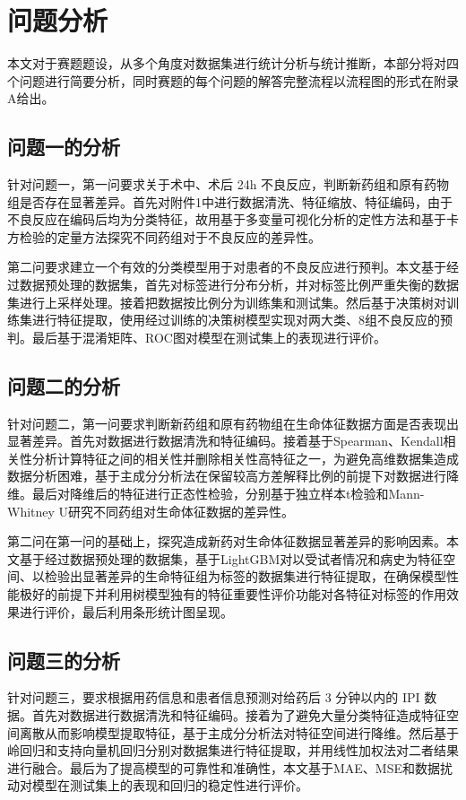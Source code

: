 \section{问题分析}

本文对于赛题题设，从多个角度对数据集进行统计分析与统计推断，本部分将对四个问题进行简要分析，同时赛题的每个问题的解答完整流程以流程图的形式在附录A给出。

\subsection{问题一的分析}

针对问题一，第一问要求关于术中、术后 24h 不良反应，判断新药组和原有药物组是否存在显著差异。首先对附件1中进行数据清洗、特征缩放、特征编码，由于不良反应在编码后均为分类特征，故用基于多变量可视化分析的定性方法和基于卡方检验的定量方法探究不同药组对于不良反应的差异性。

第二问要求建立一个有效的分类模型用于对患者的不良反应进行预判。本文基于经过数据预处理的数据集，首先对标签进行分布分析，并对标签比例严重失衡的数据集进行上采样处理。接着把数据按比例分为训练集和测试集。然后基于决策树对训练集进行特征提取，使用经过训练的决策树模型实现对两大类、8组不良反应的预判。最后基于混淆矩阵、ROC图对模型在测试集上的表现进行评价。


\subsection{问题二的分析}

针对问题二，第一问要求判断新药组和原有药物组在生命体征数据方面是否表现出显著差异。首先对数据进行数据清洗和特征编码。接着基于Spearman、Kendall相关性分析计算特征之间的相关性并删除相关性高特征之一，为避免高维数据集造成数据分析困难，基于主成分分析法在保留较高方差解释比例的前提下对数据进行降维。最后对降维后的特征进行正态性检验，分别基于独立样本t检验和Mann-Whitney U研究不同药组对生命体征数据的差异性。

第二问在第一问的基础上，探究造成新药对生命体征数据显著差异的影响因素。本文基于经过数据预处理的数据集，基于LightGBM对以受试者情况和病史为特征空间、以检验出显著差异的生命特征组为标签的数据集进行特征提取，在确保模型性能极好的前提下并利用树模型独有的特征重要性评价功能对各特征对标签的作用效果进行评价，最后利用条形统计图呈现。

\subsection{问题三的分析}

针对问题三，要求根据用药信息和患者信息预测对给药后 3 分钟以内的 IPI 数据。首先对数据进行数据清洗和特征编码。接着为了避免大量分类特征造成特征空间离散从而影响模型提取特征，基于主成分分析法对特征空间进行降维。然后基于岭回归和支持向量机回归分别对数据集进行特征提取，并用线性加权法对二者结果进行融合。最后为了提高模型的可靠性和准确性，本文基于MAE、MSE和数据扰动对模型在测试集上的表现和回归的稳定性进行评价。


